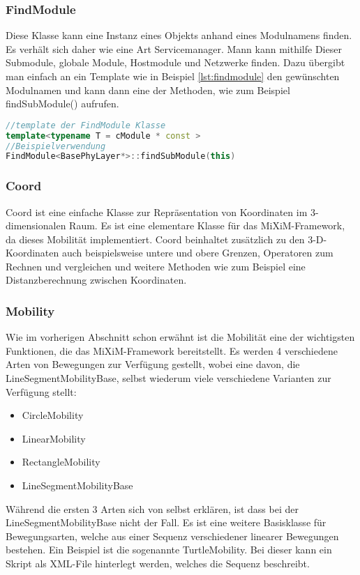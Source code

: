 \subsubsection{FindModule}

Diese Klasse kann eine Instanz eines Objekts anhand eines Modulnamens finden. Es verhält sich daher wie eine Art Servicemanager. Mann kann mithilfe Dieser Submodule, globale Module, Hostmodule und Netzwerke finden. Dazu übergibt man einfach an ein Template wie in Beispiel \ref{lst:findmodule} den gewünschten Modulnamen und kann dann eine der Methoden, wie zum Beispiel findSubModule() aufrufen.

\begin{lstlisting}[language=C++, caption={Beispiel FindModule}, label=lst:findmodule]
//template der FindModule Klasse
template<typename T = cModule * const >
//Beispielverwendung
FindModule<BasePhyLayer*>::findSubModule(this)
\end{lstlisting}

\subsubsection{Coord}

Coord ist eine einfache Klasse zur Repräsentation von Koordinaten im 3-dimensionalen Raum. Es ist eine elementare Klasse für das MiXiM-Framework, da dieses Mobilität implementiert. Coord beinhaltet zusätzlich zu den 3-D-Koordinaten auch beispielsweise untere und obere Grenzen, Operatoren zum Rechnen und vergleichen und weitere Methoden wie zum Beispiel eine Distanzberechnung zwischen Koordinaten.

\subsubsection{Mobility}

Wie im vorherigen Abschnitt schon erwähnt ist die Mobilität eine der wichtigsten Funktionen, die das MiXiM-Framework bereitstellt. Es werden 4 verschiedene Arten von Bewegungen zur Verfügung gestellt, wobei eine davon, die LineSegmentMobilityBase, selbst wiederum viele verschiedene Varianten zur Verfügung stellt: 
\begin{itemize}
\item CircleMobility
\item LinearMobility
\item RectangleMobility
\item LineSegmentMobilityBase
\end{itemize}
Während die ersten 3 Arten sich von selbst erklären, ist dass bei der LineSegmentMobilityBase nicht der Fall. Es ist eine weitere Basisklasse für Bewegungsarten, welche aus einer Sequenz verschiedener linearer Bewegungen bestehen. Ein Beispiel ist die sogenannte TurtleMobility. Bei dieser kann ein Skript als XML-File hinterlegt werden, welches die Sequenz beschreibt. 
